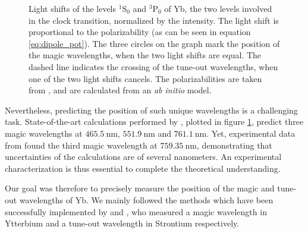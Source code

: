 \documentclass[11pt]{article}
\numberwithin{equation}{section}
\numberwithin{figure}{section}
\begin{document}
%
\begin{figure}[htbp]
	\centering
    
	\caption{\small Light shifts of the levels $^1$S$_0$ and $^3$P$_0$ of Yb, the two levels involved in the clock transition, normalized by the intensity. The light shift is proportional to the polarizability (as can be seen in equation \eqref{eq:dipole_pot}). The three circles on the graph mark the position of the magic wavelengths, when the two light shifts are equal. The dashed line indicates the crossing of the tune-out wavelengths, when one of the two light shifts cancels. The polarizabilities are taken from \cite{2010_dzuba}, and are calculated from an \emph{ab initio} model.}
    \label{fig:polarizability}
\end{figure}
%
Nevertheless, predicting the position of such unique wavelengths is a challenging task. State-of-the-art calculations performed by \cite{2010_dzuba}, plotted in figure \ref{fig:polarizability}, predict three magic wavelengths at $\SI{465.5}{\nano\metre}$, $\SI{551.9}{\nano\metre}$ and $\SI{761.1}{\nano\metre}$. Yet, experimental data from \cite{2008_barber} found the third magic wavelength at $\SI{759.35}{\nano\metre}$, demonstrating that uncertainties of the calculations are of several nanometers. An experimental characterization is thus essential to complete the theoretical understanding.

Our goal was therefore to precisely measure the position of the magic and tune-out wavelengths of Yb.  We mainly followed the methods which have been successfully implemented by \cite{2008_barber} and \cite{2020_heinz}, who measured a magic wavelength in Ytterbium and a tune-out wavelength in Strontium respectively.

\vspace{0.5cm}
\end{document}
